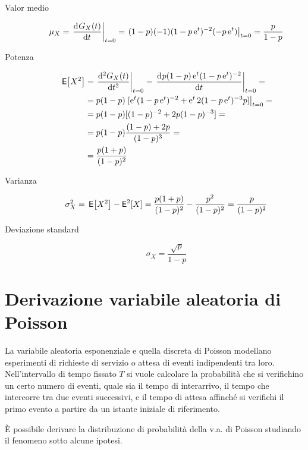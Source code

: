 \begin{description}
\item[Valor medio]
\begin{equation}
\mu_X=\restrict{\deriv{G_X(t)}{t}}{t=0}=\restrict{(1-p)(-1)(1-p\e{t})^{-2}(-p\e{t})}{t=0}=\frac{p}{1-p}
\end{equation}
\item[Potenza]
\begin{equation}
\begin{split}
\E{X^2}&=\restrict{\deriv[2]{G_X(t)}{t}}{t=0}=\restrict{\deriv{p(1-p)\e{t}(1-p\e{t})^{-2}}{t}}{t=0}=\\
&=p(1-p)\restrict{[\e{t}(1-p\e{t})^{-2}+\e{t}2(1-p\e{t})^{-3}p]}{t=0}=\\
&=p(1-p)[(1-p)^{-2}+2p(1-p)^{-3}]=\\
&=p(1-p)\frac{(1-p)+2p}{(1-p)^3}=\\
&=\frac{p(1+p)}{(1-p)^2}
\end{split}
\end{equation}
\item[Varianza]
\begin{equation}
\sigma^2_X=\E{X^2}-\Esp^2[X]=\frac{p(1+p)}{(1-p)^2}-\frac{p^2}{(1-p)^2}=\frac{p}{(1-p)^2}
\end{equation}
\item[Deviazione standard]
\begin{equation}
\sigma_X=\frac{\sqrt{p}}{1-p}
\end{equation}
\end{description}

\section{Derivazione variabile aleatoria di Poisson}
La variabile aleatoria esponenziale e quella discreta di Poisson modellano esperimenti di richieste di servizio o attesa di eventi indipendenti tra loro. Nell'intervallo di tempo fissato $T$ si vuole calcolare la probabilità che si verifichino un certo numero di eventi, quale sia il tempo di interarrivo, il tempo che intercorre tra due eventi successivi, e il tempo di attesa affinché si verifichi il primo evento a partire da un istante iniziale di riferimento.

\`{E} possibile derivare la distribuzione di probabilità della v.a. di Poisson studiando il fenomeno sotto alcune ipotesi.


